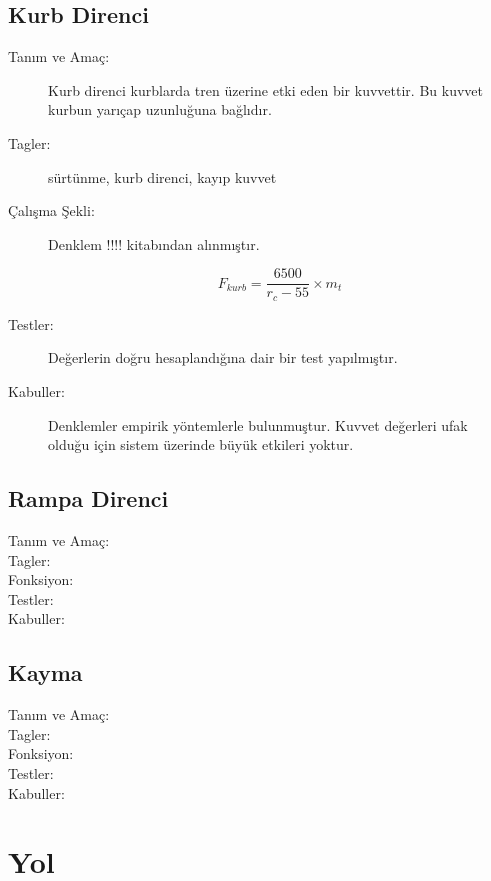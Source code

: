 \documentclass[10pt,a4paper]{article}
\begin{document}
\subsection{Kurb Direnci}
\begin{description}
\item[Tanım ve Amaç:] Kurb direnci kurblarda tren üzerine etki eden bir kuvvettir. Bu kuvvet kurbun yarıçap uzunluğuna bağlıdır.
\item[Tagler:]sürtünme, kurb direnci, kayıp kuvvet
\item[Çalışma Şekli:] Denklem !!!! kitabından alınmıştır.

\begin{equation}
F_{kurb} = \dfrac{6500}{r_c - 55} \times m_t
\end{equation}

\item[Testler:] Değerlerin doğru hesaplandığına dair bir test yapılmıştır.
\item[Kabuller:] Denklemler empirik yöntemlerle bulunmuştur. Kuvvet değerleri ufak olduğu için sistem üzerinde büyük etkileri yoktur.
\end{description}
\newpage

\subsection{Rampa Direnci}
\begin{description}
\item[Tanım ve Amaç:] 
\item[Tagler:]
\item[Fonksiyon:]
\item[Testler:]
\item[Kabuller:]
\end{description}
\newpage

\subsection{Kayma}
\begin{description}
\item[Tanım ve Amaç:] 
\item[Tagler:]
\item[Fonksiyon:]
\item[Testler:]
\item[Kabuller:]
\end{description}

\newpage

\section{Yol}
\end{document}

